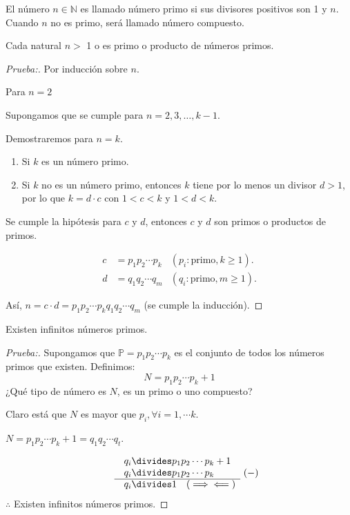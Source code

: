 \begin{definition}

El número $n\in\mathbb{N}$ es llamado número primo si sus divisores positivos son 1 y $n$. Cuando $n$ no es primo, será llamado número compuesto. 

\end{definition}

\begin{theorem}
Cada natural $n>$ 1 o es primo o producto de números primos.

\begin{proof}[Prueba:]
Por inducción sobre $n$.

Para $n=2$ \checkmark

Supongamos que se cumple para $n=2,3,\ldots,k-1$.

Demostraremos para $n=k$.

\begin{enumerate}[font={\bfseries},label={*)}]

\item Si $k$ es un número primo.

\item Si $k$ no es un número primo, entonces $k$ tiene por lo menos un divisor $d>1$, por lo que $k=d\cdot c$ con $1<c<k$ y $1<d<k$.

\end{enumerate}

\noindent
Se cumple la hipótesis para $c$ y $d$, entonces $c$ y $d$ son primos o productos de primos.

\begin{align*}
c&=p_1p_2\cdots p_k&(p_i\colon\text{primo}, k\geq1).\\
d&=q_1q_2\cdots q_m&(q_i\colon\text{primo}, m\geq1).
\end{align*}

\noindent
Así, $n=c\cdot d=p_1p_2\cdots p_kq_1q_2\cdots q_m$ (se cumple la inducción).
\end{proof}
\end{theorem}

\begin{theorem}
Existen infinitos números primos.

\begin{proof}[Prueba:]

Supongamos que $\boxed{\mathbb{P}=p_1p_2\cdots p_k}$ es el conjunto  de todos los números primos que existen. Definimos:
\[N=p_1p_2\cdots p_k+1\]
¿Qué tipo de número es $N$, es un primo o uno compuesto?

\noindent
Claro está que $N$ es mayor que $p_i,\forall i=1,\cdots k$.

$N=p_1p_2\cdots p_k+1=q_1q_2\cdots q_t$.

\[\begin{array}{l@{\quad}cr@{}l}
&& q_i & {}\divides p_1p_2\cdots p_k+1 \\
&& q_i & {}\divides p_1p_2\cdots p_k \\ \cline{2-4}
&& q_i & {}\divides 1\quad(\implies\impliedby)
\end{array}\ (-)\]
$\therefore$ Existen infinitos números primos. %
\end{proof}

\end{theorem}

